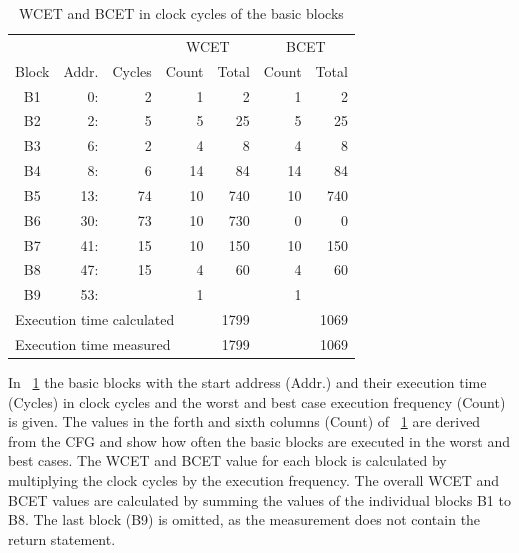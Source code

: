 
%    
%
\begin{table}
\centering
\begin{tabular*}{\columnwidth}{@{\extracolsep{\fill}}crrrrrr}
    \toprule
    & & &\multicolumn{2}{c}{WCET} & \multicolumn{2}{c}{BCET} \\
    Block & Addr. & Cycles & Count & Total & Count & Total \\
    \midrule
B1 & 0: &  2 &  1 &   2 &  1 &   2 \\
B2 & 2: &  5 &  5 &  25 &  5 &  25 \\
B3 & 6: &  2 &  4 &   8 &  4 &   8 \\
B4 & 8: &  6 & 14 &  84 & 14 &  84 \\
B5 &13: & 74 & 10 & 740 & 10 & 740 \\
B6 &30: & 73 & 10 & 730 &  0 &   0 \\
B7 &41: & 15 & 10 & 150 & 10 & 150 \\
B8 &47: & 15 &  4 &  60 &  4 &  60 \\
B9 &53: &    &  1 &     &  1 &     \\
\midrule
\multicolumn{4}{l}{Execution time calculated} & 1799  &    & 1069 \\
\multicolumn{4}{l}{Execution time measured}   & 1799  &    & 1069 \\
\bottomrule

\end{tabular*}
    \caption{WCET and BCET in clock cycles of the basic blocks}
    \label{tab:results:bubble:blocks}
\end{table}




In \tablename~\ref{tab:results:bubble:blocks} the basic blocks with
the start address (Addr.) and their execution time (Cycles) in clock
cycles and the worst and best case execution frequency (Count) is
given. The values in the forth and sixth columns (Count) of
\tablename~\ref{tab:results:bubble:blocks} are derived from the CFG
and show how often the basic blocks are executed in the worst and
best cases. The WCET and BCET value for each block is calculated by
multiplying the clock cycles by the execution frequency. The overall
WCET and BCET values are calculated by summing the values of the
individual blocks B1 to B8. The last block (B9) is omitted, as the
measurement does not contain the return statement.


